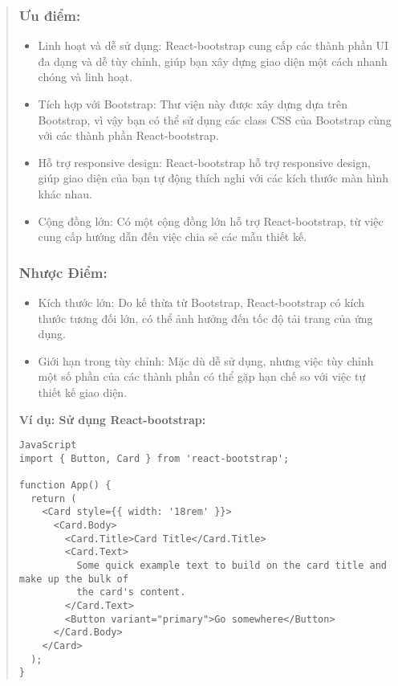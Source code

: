 \begin{quote}
\subsubsection{Ưu điểm:}
\begin{itemize}
  \item Linh hoạt và dễ sử dụng: React-bootstrap cung cấp các thành phần UI đa dạng và dễ tùy chỉnh, giúp bạn xây dựng giao diện một cách nhanh chóng và linh hoạt.
  \item Tích hợp với Bootstrap: Thư viện này được xây dựng dựa trên Bootstrap, vì vậy bạn có thể sử dụng các class CSS của Bootstrap cùng với các thành phần React-bootstrap.
  \item Hỗ trợ responsive design: React-bootstrap hỗ trợ responsive design, giúp giao diện của bạn tự động thích nghi với các kích thước màn hình khác nhau.
  \item Cộng đồng lớn: Có một cộng đồng lớn hỗ trợ React-bootstrap, từ việc cung cấp hướng dẫn đến việc chia sẻ các mẫu thiết kế.
\end{itemize}

\subsubsection{Nhược Điểm:}
\begin{itemize}
  \item Kích thước lớn: Do kế thừa từ Bootstrap, React-bootstrap có kích thước tương đối lớn, có thể ảnh hưởng đến tốc độ tải trang của ứng dụng.
  \item Giới hạn trong tùy chỉnh: Mặc dù dễ sử dụng, nhưng việc tùy chỉnh một số phần của các thành phần có thể gặp hạn chế so với việc tự thiết kế giao diện.
\end{itemize}

\textbf{Ví dụ: Sử dụng React-bootstrap:}
\begin{lstlisting}
JavaScript
import { Button, Card } from 'react-bootstrap';

function App() {
  return (
    <Card style={{ width: '18rem' }}>
      <Card.Body>
        <Card.Title>Card Title</Card.Title>
        <Card.Text>
          Some quick example text to build on the card title and make up the bulk of
          the card's content.
        </Card.Text>
        <Button variant="primary">Go somewhere</Button>
      </Card.Body>
    </Card>
  );
}
\end{lstlisting}
\end{quote}


